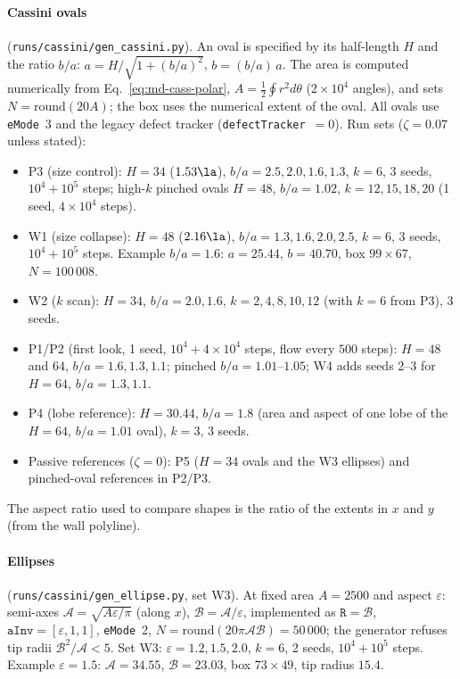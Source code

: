 \paragraph{Cassini ovals} (\texttt{runs/cassini/gen\_cassini.py}). An oval is specified by its half-length $H$ and the ratio $b/a$:
$a=H/\sqrt{1+(b/a)^2}$, $b=(b/a)\,a$. The area is computed numerically from Eq.~\eqref{eq:md-cass-polar},
$A=\tfrac12\oint r^2d\theta$ ($2\times10^4$ angles), and sets $N=\mathrm{round}(20A)$; the box uses the numerical extent of the
oval. All ovals use \texttt{eMode}~3 and the legacy defect tracker (\texttt{defectTracker}~$=0$). Run sets ($\zeta=0.07$ unless stated):
\begin{itemize}
\item P3 (size control): $H=34$ ($1.53\la$), $b/a=2.5,2.0,1.6,1.3$, $k=6$, 3 seeds, $10^4+10^5$ steps;
  high-$k$ pinched ovals $H=48$, $b/a=1.02$, $k=12,15,18,20$ (1 seed, $4\times10^4$ steps).
\item W1 (size collapse): $H=48$ ($2.16\la$), $b/a=1.3,1.6,2.0,2.5$, $k=6$, 3 seeds, $10^4+10^5$ steps.
  Example $b/a=1.6$: $a=25.44$, $b=40.70$, box $99\times67$, $N=100\,008$.
\item W2 ($k$ scan): $H=34$, $b/a=2.0,1.6$, $k=2,4,8,10,12$ (with $k=6$ from P3), 3 seeds.
\item P1/P2 (first look, 1 seed, $10^4+4\times10^4$ steps, flow every $500$ steps): $H=48$ and $64$, $b/a=1.6,1.3,1.1$;
  pinched $b/a=1.01$--$1.05$; W4 adds seeds 2--3 for $H=64$, $b/a=1.3,1.1$.
\item P4 (lobe reference): $H=30.44$, $b/a=1.8$ (area and aspect of one lobe of the $H=64$, $b/a=1.01$ oval), $k=3$, 3 seeds.
\item Passive references ($\zeta=0$): P5 ($H=34$ ovals and the W3 ellipses) and pinched-oval references in P2/P3.
\end{itemize}
The aspect ratio used to compare shapes is the ratio of the extents in $x$ and $y$ (from the wall polyline).

\paragraph{Ellipses} (\texttt{runs/cassini/gen\_ellipse.py}, set W3). At fixed area $A=2500$ and aspect $\varepsilon$:
semi-axes $\mathcal A=\sqrt{A\varepsilon/\pi}$ (along $x$), $\mathcal B=\mathcal A/\varepsilon$, implemented as
$\texttt{R}=\mathcal B$, $\texttt{aInv}=[\varepsilon,1,1]$, \texttt{eMode}~2, $N=\mathrm{round}(20\pi\mathcal A\mathcal B)=50\,000$;
the generator refuses tip radii $\mathcal B^2/\mathcal A<5$. Set W3: $\varepsilon=1.2,1.5,2.0$, $k=6$, 2 seeds, $10^4+10^5$ steps.
Example $\varepsilon=1.5$: $\mathcal A=34.55$, $\mathcal B=23.03$, box $73\times49$, tip radius $15.4$.

